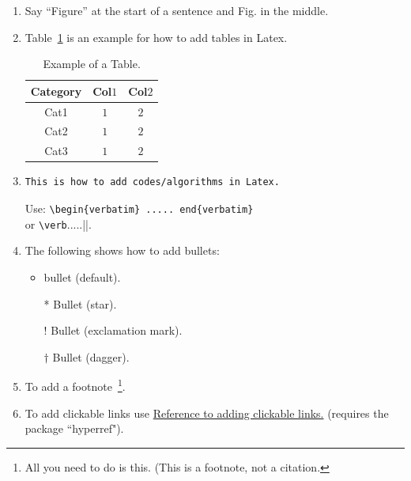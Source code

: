 \documentclass[pre,aps,reprint,noshowpacs,superscriptaddress,floatfix,letterpaper,longbibliography]{revtex4-2}
\begin{document}
\begin{enumerate}
\item Say ``Figure'' at the start of a sentence and Fig. in the middle.  

\item Table~\ref{Table1} is an example for how to add tables in Latex. 
\begin{table}[h!] 
\footnotesize
\begin{tabular}{| c | c | c |} %
\hline\hline 
Category & Col$1$ & Col$2$\\
[0.5ex] %
\hline 
Cat1&$1$&$2$\\
Cat2&$1$&$2$\\
Cat3&$1$&$2$\\
[0.5ex]
\hline\hline 
\end{tabular} 
\caption{\footnotesize{Example of a Table.}}
\label{Table1} 
\end{table} 


\item \begin{verbatim}
This is how to add codes/algorithms in Latex.
\end{verbatim} 
Use: \verb|\begin{verbatim} ..... end{verbatim}|  \\ 
or \verb|\verb|.....||. 

\item The following shows how to add bullets: 
\begin{itemize}
  \item bullet (default). 
  \item[*] Bullet (star). 
  \item[!] Bullet (exclamation mark).  
  \item[$\dagger$] Bullet (dagger). 
  \label{ListBullets}
\end{itemize}

\item To add a footnote~\footnote{All you need to do is this. (This is a footnote, not a citation.}. 

\item To add clickable links use 
\href{https://latex-tutorial.com/tutorials/hyperlinks/}{Reference to adding clickable links.} (requires the package ``hyperref"). 


\end{enumerate}
\end{document}
